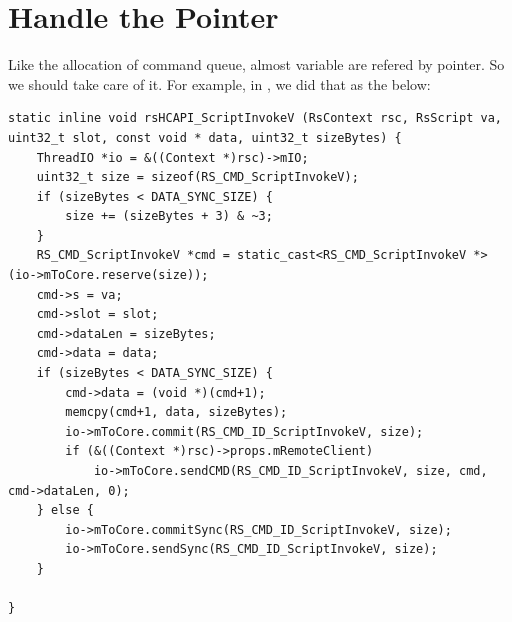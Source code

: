 \section{Handle the Pointer}
\label{s:rsListeningThread}
Like the allocation of command queue, almost variable are refered by pointer. So we should take care of it. For example, in \Fountain{}, we did that as the below:
\begin{lstlisting}
static inline void rsHCAPI_ScriptInvokeV (RsContext rsc, RsScript va, uint32_t slot, const void * data, uint32_t sizeBytes) {
    ThreadIO *io = &((Context *)rsc)->mIO;
    uint32_t size = sizeof(RS_CMD_ScriptInvokeV);
    if (sizeBytes < DATA_SYNC_SIZE) {
        size += (sizeBytes + 3) & ~3; 
    }   
    RS_CMD_ScriptInvokeV *cmd = static_cast<RS_CMD_ScriptInvokeV *>(io->mToCore.reserve(size));
    cmd->s = va; 
    cmd->slot = slot;
    cmd->dataLen = sizeBytes;
    cmd->data = data; 
    if (sizeBytes < DATA_SYNC_SIZE) {
        cmd->data = (void *)(cmd+1);
        memcpy(cmd+1, data, sizeBytes);
        io->mToCore.commit(RS_CMD_ID_ScriptInvokeV, size);
        if (&((Context *)rsc)->props.mRemoteClient)
            io->mToCore.sendCMD(RS_CMD_ID_ScriptInvokeV, size, cmd, cmd->dataLen, 0); 
    } else {
        io->mToCore.commitSync(RS_CMD_ID_ScriptInvokeV, size);
        io->mToCore.sendSync(RS_CMD_ID_ScriptInvokeV, size);
    }   

}
\end{lstlisting}







